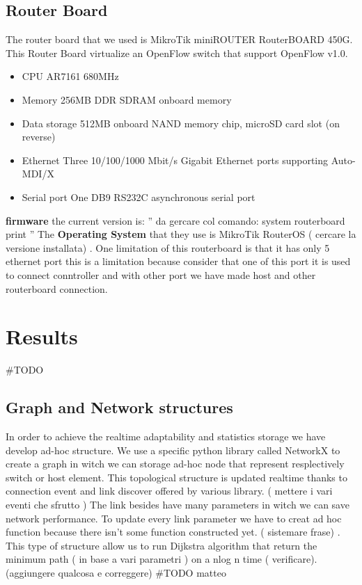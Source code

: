 \documentclass[conference,10pt]{IEEEtran}
\begin{document}
  \subsection{Router Board}
  The router board that we used is MikroTik miniROUTER RouterBOARD 450G. This Router Board virtualize an OpenFlow switch that support
  OpenFlow v1.0\cite{routerboard_doc}.
  \begin{itemize}
   \item CPU		AR7161 680MHz
   \item Memory		256MB DDR SDRAM onboard memory
   \item Data storage	512MB onboard NAND memory chip, microSD card slot (on reverse)
   \item Ethernet 	Three 10/100/1000 Mbit/s Gigabit Ethernet ports supporting Auto-MDI/X
   \item Serial port 	One DB9 RS232C asynchronous serial port
  \end{itemize}
  \textbf{firmware} the current version is: '' da gercare col comando: system routerboard print ''
  \newline
  The \textbf{Operating System} that they use is MikroTik RouterOS ( cercare la versione installata) \cite{routeboard_software}.
  \newline
  One limitation of this routerboard is that it has only 5 ethernet port this is a limitation because consider that one of this port it is
  used to connect conntroller and with other port we have made host and other routerboard connection.


\section{Results}\label{sec:results}
\#TODO %
  \subsection{Graph and Network structures}
  In order to achieve the realtime adaptability and statistics storage we have develop ad-hoc structure.
  We use a specific python library called NetworkX \cite{networkx} to create a graph in witch we can storage ad-hoc node that represent
  resplectively switch or host element.
  This topological structure is updated realtime thanks to connection event and link discover offered by various library.
  ( mettere i vari eventi che sfrutto )
  The link besides have many parameters in witch we can save network performance. To update every link parameter we have to creat ad hoc function
  because there isn't some function constructed yet. ( sistemare frase) .
  This type of structure allow us to run Dijkstra algorithm that return the minimum path ( in base a vari parametri ) on a nlog n time ( verificare).
  (aggiungere qualcosa e correggere)
  \#TODO matteo
\end{document}
